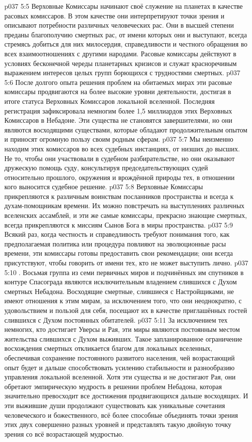 \vs p037 5:5 Верховные Комиссары начинают своё служение на планетах в качестве расовых комиссаров. В этом качестве они интерпретируют точки зрения и описывают потребности различных человеческих рас. Они в высшей степени преданы благополучию смертных рас, от имени которых они и выступают, всегда стремясь добиться для них милосердия, справедливости и честного обращения во всех взаимоотношениях с другими народами. Расовые комиссары действуют в условиях бесконечной череды планетарных кризисов и служат красноречивым выражением интересов целых групп борющихся с трудностями смертных.
\vs p037 5:6 После долгого опыта решения проблем на обитаемых мирах эти расовые комиссары продвигаются на более высокие уровни деятельности, достигая в итоге статуса Верховных Комиссаров локальной вселенной. Последняя регистрация зафиксировала немногим более 1,5 миллиардов этих Верховных Комиссаров в Небадоне. Эти существа не становятся завершителями, но они являются восходящими существами, которые обладают продолжительным опытом и приносят огромную пользу своим родным сферам.
\vs p037 5:7 Мы неизменно находим этих комиссаров во всех судебных инстанциях, от низших до высших. Не то, чтобы они участвовали в судебном разбирательстве, но они оказывают дружескую помощь суду, консультируя председательствующих судей относительно прошлого, окружения и врождённой природы тех, в отношении кого выносится судебное решение.
\vs p037 5:8 Верховные Комиссары прикрепляются к различным воинствам посланников пространства и всегда к духам\hyp{}помощникам времени. Их можно повстречать на выступлениях различных вселенских ассамблей, и эти же самые комиссары, прекрасно знающие смертных, всегда прикрепляются к миссиям Сынов Бога в миры пространства.
\vs p037 5:9 Всякий раз, когда честность и справедливость требуют понимания того, как предполагаемая политика или процедура повлияют на эволюционные расы времени, эти комиссары готовы предоставить свои рекомендации; они всегда присутствуют, чтобы говорить от имени тех, кто не может выступить лично.
\vs p037 5:10 \pc {}. Восьмая группа из семи первичных миров и подчинённых им спутников в контуре Спасограда являются исключительным владением слившихся с Духом смертных Небадона. Восходящие смертные, слившиеся с Настройщиками, не имеют отношения к этим мирам, за исключением того, что они неоднократно, с удовольствием и пользой для себя, посещают их в качестве приглашённых гостей слившихся с Духом постоянных обитателей.
\vs p037 5:11 За исключением тех немногих, кто достигает Уверсы и Рая, эти миры являются постоянным местом жительства слившихся с Духом выживших. Такое запланированное ограничение восхождения смертных откликается благом для локальных вселенных, обеспечивая сохранение постоянного развитого населения, чей возрастающий опыт будет и дальше способствовать усилению стабильности и разнообразию управления локальной вселенной. Хотя эти существа и не достигают Рая, они обретают эмпирическую мудрость в решении проблем Небадона, которая значительно превосходит все достижения продвигающихся дальше восходящих. И эти выжившие души продолжают существовать как уникальные сочетания человеческого и божественного, всё более способные объединять точки зрения этих двух совершенно разных уровней и представлять такую двойную точку зрения со всё возрастающей мудростью.
